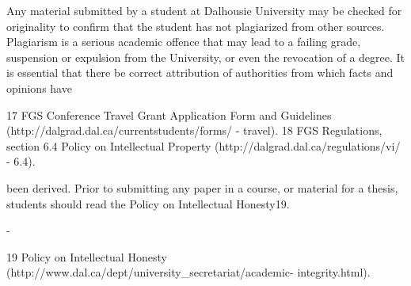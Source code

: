 Any material submitted by a student at Dalhousie University may be checked for originality to confirm that the student has not plagiarized from other sources. Plagiarism is a serious academic offence that may lead to a failing grade, suspension or expulsion from the University, or even the revocation of a degree.  It is essential that there be correct attribution of authorities from which facts and opinions have




17 FGS Conference Travel Grant Application Form and Guidelines (http://dalgrad.dal.ca/currentstudents/forms/ - travel).
18 FGS Regulations, section 6.4 Policy on Intellectual Property (http://dalgrad.dal.ca/regulations/vi/ - 6.4).
 

been derived. Prior to submitting any paper in a course, or material for a thesis, students should read the Policy on Intellectual Honesty19.





-










































19 Policy on Intellectual Honesty (http://www.dal.ca/dept/university_secretariat/academic- integrity.html).
 

